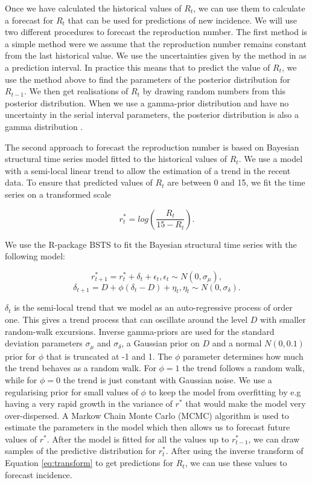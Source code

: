 \documentclass[12pt]{article}
\begin{document}
Once we have calculated the historical values of $R_t$, we can use them to calculate a forecast for $R_t$ that can be used for predictions of new incidence. We will use two different procedures to forecast the reproduction number. The first method is a simple method were we assume that the reproduction number remains constant from the last historical value. We use the uncertainties given by the method in \cite{coriNewFrameworkSoftware2013} as a prediction interval. In practice this means that to predict the value of $R_t$, we use the method above to find the parameters of the posterior distribution for $R_{t-1}$. We then get realisations of $R_t$ by drawing random numbers from this posterior distribution. When we use a gamma-prior distribution and have no uncertainty in the serial interval parameters, the posterior distribution is also a gamma distribution  \cite{coriNewFrameworkSoftware2013}.

The second approach to forecast the reproduction number is based on Bayesian structural time series model fitted to the historical values of $R_t$. We use a model with a semi-local linear trend to allow the estimation of a trend in the recent data. To ensure that predicted values of $R_t$ are between 0 and 15, we fit the time series on a transformed scale

\begin{equation}
r^*_t = log\left(\frac{R_t}{15 - R_t}\right).
\label{eq:transform}
\end{equation}

We use the R-package BSTS \cite{scottBstsBayesianStructural2019} to fit the Bayesian structural time series with the following model:

\[r^*_{t+1} = r^*_t + \delta_t + \epsilon_t, \epsilon_t \sim N(0, \sigma_\mu),\]
\[\delta_{t+1} = D + \phi(\delta_t - D) + \eta_t, \eta_t \sim N(0, \sigma_\delta).\]

$\delta_t$ is the semi-local trend that we model as an auto-regressive process of order one. This gives a trend process that can oscillate around the level $D$ with smaller random-walk excursions. Inverse gamma-priors are used for the standard deviation parameters $\sigma_\mu$ and $\sigma_\delta$, a Gaussian prior on $D$ and a normal $N(0, 0.1)$ prior for $\phi$ that is truncated at -1 and 1. The $\phi$ parameter determines how much the trend behaves as a random walk. For $\phi=1$ the trend follows a random walk, while for $\phi=0$ the trend is just constant with Gaussian noise. We use a regularising prior for small values of $\phi$ to keep the model from overfitting by e.g having a very rapid growth in the variance of $r^*$ that would make the model very over-dispersed. A Markow Chain Monte Carlo (MCMC) algorithm is used to estimate the parameters in the model which then allows us to forecast future values of $r^*$. After the model is fitted for all the values up to  $r^*_{t-1}$, we can draw samples of the predictive distribution for $r^*_t$. After using the inverse transform of Equation \ref{eq:transform} to get predictions for $R_t$, we can use these values to forecast incidence. 
\end{document}
